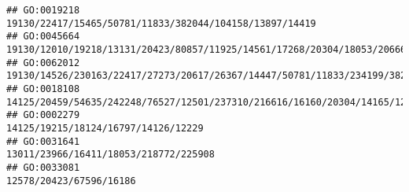\documentclass[
]{article}
\begin{document}
\begin{verbatim}
## GO:0019218                                                                                                                                                                                                                                                                                                                                                      19130/22417/15465/50781/11833/382044/104158/13897/14419
## GO:0045664                                                                                                                                                                                                                                                                                                                         19130/12010/19218/13131/20423/80857/11925/14561/17268/20304/18053/20666/50779/104156
## GO:0062012                                                                                                                                                                                                                                                                                 19130/14526/230163/22417/27273/20617/26367/14447/50781/11833/234199/382044/104158/13897/11808/66113/103142/20533/81799/16149
## GO:0018108                                                                                                                                                                                                                                                                                                          14125/20459/54635/242248/76527/12501/237310/216616/16160/20304/14165/12143/547253/16149/14585/12229
## GO:0002279                                                                                                                                                                                                                                                                                                                                                                          14125/19215/18124/16797/14126/12229
## GO:0031641                                                                                                                                                                                                                                                                                                                                                                        13011/23966/16411/18053/218772/225908
## GO:0033081                                                                                                                                                                                                                                                                                                                                                                                      12578/20423/67596/16186

\end{verbatim}
\end{document}
